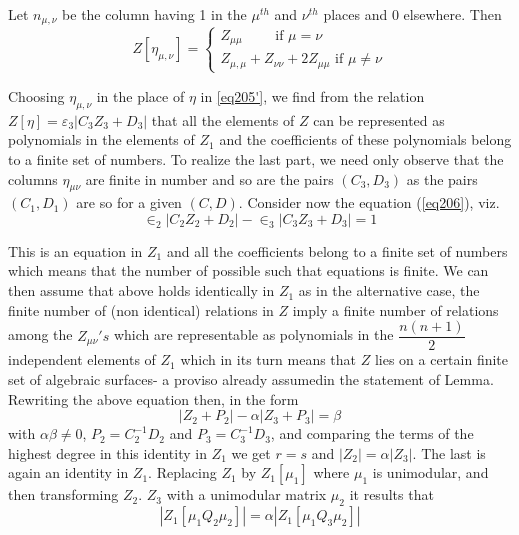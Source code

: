 Let $n_{\mu , \nu}$ be the column having 1 in the $\mu^{th}$ and
$\nu^{th}$ places and $0$ elsewhere. Then 
\begin{equation*}
Z [\eta_{\mu , \nu}] = 
\begin{cases}
Z _{\mu \mu} \qquad \text{ if } \mu = \nu\\
Z_{\mu , \mu} + Z_{\nu \nu}+ 2Z_{\mu \mu} \text{ if } \mu \neq \nu
\tag{207}\label{eq207}  
\end{cases}
\end{equation*}

Choosing\label{p165} $\eta_{\mu, \nu}$ in the place of $\eta$ in
\ref{eq205'}, we find 
from the relation $Z [\eta] = \varepsilon_3 |C_3 Z_3 + D_3 |$ that all
the elements of $Z$ can be represented as polynomials in the elements
of $Z_1$ and the coefficients of these polynomials belong to a finite
set  of numbers. To realize the last part, we need only observe that
the columns $\eta_{\mu \nu}$ are finite in number and so are the pairs
$(C_3 , D_3)$ as the pairs $(C_1 , D_1)$ are so for a given
$(C,D)$. Consider now the equation (\ref{eq206}), viz. 
$$
\in_2 |C_2 Z_2 + D_2 | - \in _3 |C_3 Z_3 + D_3 | =1 
$$ 

This is an equation in $Z_1$ and all the coefficients belong to a
finite set of numbers which means that the number of possible such
that equations is finite. We can then assume that above holds
identically in $Z_1$ as in the alternative case, the finite number of
(non identical) relations in $Z$ imply a finite number of relations
among the $Z _{\mu \nu }'s$ which are representable as polynomials in
the $\dfrac{n (n+1)}{2}$ independent elements of $Z_1$ which in its
turn  means that $Z$ lies on a certain finite set of algebraic
surfaces- a proviso already assumed\pageoriginale in the statement of
Lemma. Rewriting the above equation then, in the form 
\begin{equation*}
|Z_2 + P_2 | - \alpha |Z_3 + P_3| = \beta \tag{208}\label{eq208} 
 \end{equation*}
 with $\alpha \beta \neq 0$, $P_2 = C_2 ^{-1} D_2 $ and $P_3 =
 C_3^{-1} D_3$, and comparing the terms of the highest degree in this
 identity in $Z_1$ we get $r = s$ and $|Z_2| = \alpha |Z_3|$. The
 last is again an identity in $Z_1$. Replacing $Z_1$ by $Z_1 [\mu_1]$
 where $\mu_1$ is unimodular, and then transforming $Z_2$. $Z_3$ with
 a unimodular matrix $\mu_2$ it results that 
 \begin{equation*}
|Z _1 [\mu_1 Q_2 \mu_2 ]| = \alpha |Z_1 [\mu _1 Q_3 \mu_2] |
\tag{209}\label{eq209}  
 \end{equation*} 
 
